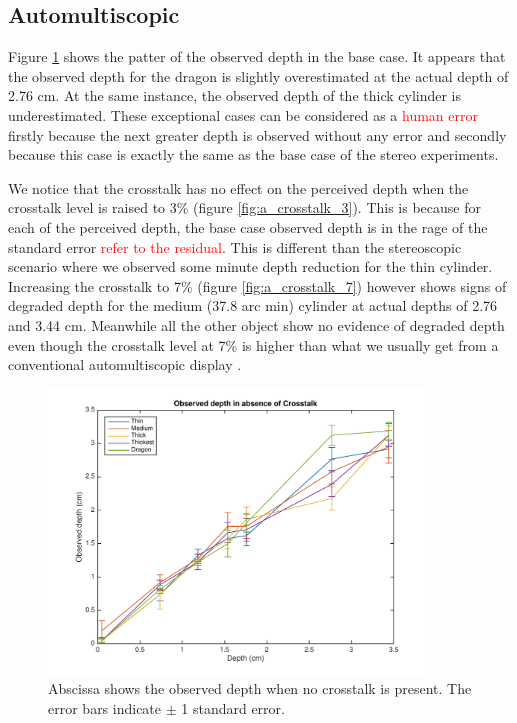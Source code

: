\subsection{Automultiscopic}


Figure \ref{fig:a_crosstalk_0} shows the patter of the observed depth in the base case. It appears that the observed depth for the dragon is slightly overestimated at the actual depth of 2.76 cm. At the same instance, the observed depth of the thick cylinder is underestimated. These exceptional cases can be considered as a \textcolor{red}{human error} firstly because the next greater depth is observed without any error and secondly because this case is exactly the same as the base case of the stereo experiments.

We notice that the crosstalk has no effect on the perceived depth when the crosstalk level is raised to 3\% (figure \ref{fig:a_crosstalk_3}). This is because for each of the perceived depth, the base case observed depth is in the rage of the standard error \textcolor{red}{refer to the residual}. This is different than the stereoscopic scenario where we observed some minute depth reduction for the thin cylinder. Increasing the crosstalk to 7\% (figure \ref{fig:a_crosstalk_7}) however shows signs of degraded depth for the medium (37.8 arc min) cylinder at actual depths of 2.76 and 3.44 cm. Meanwhile all the other object show no evidence of degraded depth even though the crosstalk level at 7\% is higher than what we usually get from a conventional automultiscopic display \cite{woods2012crosstalk}.
\begin{figure}[H]
\centering
    \includegraphics[width=0.9\textwidth]{./Template_Figures/a_crosstalk_0}
    \caption{Abscissa shows the observed depth when no crosstalk is present. The error bars indicate $\pm$ 1 standard error.\label{fig:a_crosstalk_0}}
\end{figure}

